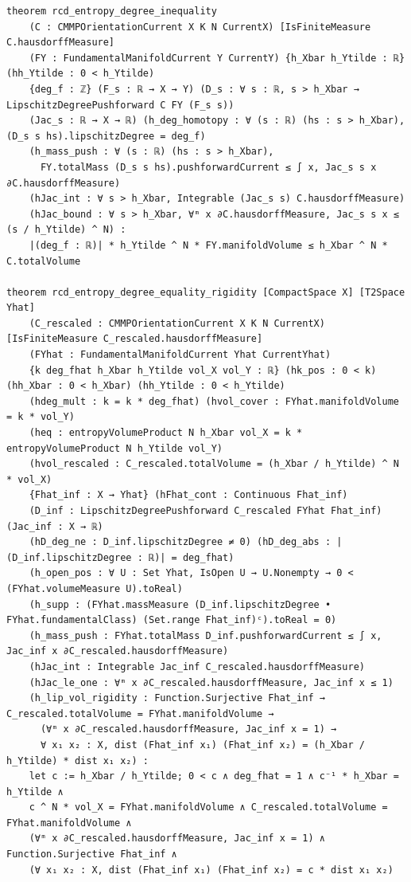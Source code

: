 \documentclass[10pt]{article}
\renewcommand{\_}{\origus\allowbreak}
\newcommand{\code}[1]{\texttt{#1}}
\begin{document}
\begin{lstlisting}[caption={Master entropy-degree inequality and equality rigidity signatures in \code{RCDEntropyDegree.RCD}.}]
theorem rcd_entropy_degree_inequality
    (C : CMMPOrientationCurrent X K N CurrentX) [IsFiniteMeasure C.hausdorffMeasure]
    (FY : FundamentalManifoldCurrent Y CurrentY) {h_Xbar h_Ytilde : ℝ} (hh_Ytilde : 0 < h_Ytilde)
    {deg_f : ℤ} (F_s : ℝ → X → Y) (D_s : ∀ s : ℝ, s > h_Xbar → LipschitzDegreePushforward C FY (F_s s))
    (Jac_s : ℝ → X → ℝ) (h_deg_homotopy : ∀ (s : ℝ) (hs : s > h_Xbar), (D_s s hs).lipschitzDegree = deg_f)
    (h_mass_push : ∀ (s : ℝ) (hs : s > h_Xbar),
      FY.totalMass (D_s s hs).pushforwardCurrent ≤ ∫ x, Jac_s s x ∂C.hausdorffMeasure)
    (hJac_int : ∀ s > h_Xbar, Integrable (Jac_s s) C.hausdorffMeasure)
    (hJac_bound : ∀ s > h_Xbar, ∀ᵐ x ∂C.hausdorffMeasure, Jac_s s x ≤ (s / h_Ytilde) ^ N) :
    |(deg_f : ℝ)| * h_Ytilde ^ N * FY.manifoldVolume ≤ h_Xbar ^ N * C.totalVolume

theorem rcd_entropy_degree_equality_rigidity [CompactSpace X] [T2Space Yhat]
    (C_rescaled : CMMPOrientationCurrent X K N CurrentX) [IsFiniteMeasure C_rescaled.hausdorffMeasure]
    (FYhat : FundamentalManifoldCurrent Yhat CurrentYhat)
    {k deg_fhat h_Xbar h_Ytilde vol_X vol_Y : ℝ} (hk_pos : 0 < k) (hh_Xbar : 0 < h_Xbar) (hh_Ytilde : 0 < h_Ytilde)
    (hdeg_mult : k = k * deg_fhat) (hvol_cover : FYhat.manifoldVolume = k * vol_Y)
    (heq : entropyVolumeProduct N h_Xbar vol_X = k * entropyVolumeProduct N h_Ytilde vol_Y)
    (hvol_rescaled : C_rescaled.totalVolume = (h_Xbar / h_Ytilde) ^ N * vol_X)
    {Fhat_inf : X → Yhat} (hFhat_cont : Continuous Fhat_inf)
    (D_inf : LipschitzDegreePushforward C_rescaled FYhat Fhat_inf) (Jac_inf : X → ℝ)
    (hD_deg_ne : D_inf.lipschitzDegree ≠ 0) (hD_deg_abs : |(D_inf.lipschitzDegree : ℝ)| = deg_fhat)
    (h_open_pos : ∀ U : Set Yhat, IsOpen U → U.Nonempty → 0 < (FYhat.volumeMeasure U).toReal)
    (h_supp : (FYhat.massMeasure (D_inf.lipschitzDegree • FYhat.fundamentalClass) (Set.range Fhat_inf)ᶜ).toReal = 0)
    (h_mass_push : FYhat.totalMass D_inf.pushforwardCurrent ≤ ∫ x, Jac_inf x ∂C_rescaled.hausdorffMeasure)
    (hJac_int : Integrable Jac_inf C_rescaled.hausdorffMeasure)
    (hJac_le_one : ∀ᵐ x ∂C_rescaled.hausdorffMeasure, Jac_inf x ≤ 1)
    (h_lip_vol_rigidity : Function.Surjective Fhat_inf → C_rescaled.totalVolume = FYhat.manifoldVolume →
      (∀ᵐ x ∂C_rescaled.hausdorffMeasure, Jac_inf x = 1) →
      ∀ x₁ x₂ : X, dist (Fhat_inf x₁) (Fhat_inf x₂) = (h_Xbar / h_Ytilde) * dist x₁ x₂) :
    let c := h_Xbar / h_Ytilde; 0 < c ∧ deg_fhat = 1 ∧ c⁻¹ * h_Xbar = h_Ytilde ∧
    c ^ N * vol_X = FYhat.manifoldVolume ∧ C_rescaled.totalVolume = FYhat.manifoldVolume ∧
    (∀ᵐ x ∂C_rescaled.hausdorffMeasure, Jac_inf x = 1) ∧ Function.Surjective Fhat_inf ∧
    (∀ x₁ x₂ : X, dist (Fhat_inf x₁) (Fhat_inf x₂) = c * dist x₁ x₂)
\end{lstlisting}
\end{document}
